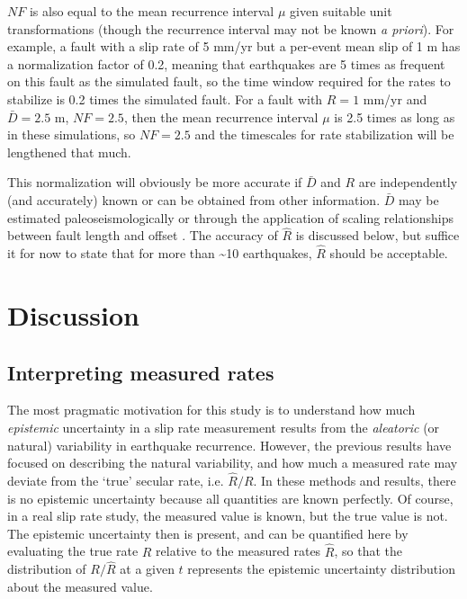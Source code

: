 \documentclass[se, manuscript]{copernicus}
\begin{document}
\(NF\) is also equal to the mean recurrence interval \(\mu\) given
suitable unit transformations (though the recurrence interval may not be
known \emph{a priori}). For example, a fault with a slip rate of 5 mm/yr
but a per-event mean slip of 1 m has a normalization factor of 0.2,
meaning that earthquakes are 5 times as frequent on this fault as the
simulated fault, so the time window required for the rates to stabilize
is 0.2 times the simulated fault. For a fault with \(R=1\) mm/yr and
\(\bar{D}=2.5\) m, \(NF=2.5\), then the mean recurrence interval \(\mu\)
is 2.5 times as long as in these simulations, so \(NF=2.5\) and the
timescales for rate stabilization will be lengthened that much.

This normalization will obviously be more accurate if \(\bar{D}\) and \(R\) are
independently (and accurately) known or can be obtained from other information.
\(\bar{D}\) may be estimated paleoseismologically or through the application of
scaling relationships between fault length and offset
\citep{wells_new_1994,leonard_earthquake_2010}. The accuracy of \(\hat{R}\) is
discussed below, but suffice it for now to state that for more than
\textasciitilde{}10 earthquakes, \(\hat{R}\) should be acceptable.

\section{Discussion}\label{discussion}

\subsection{Interpreting measured
rates}\label{interpreting-measured-rates}

The most pragmatic motivation for this study is to understand how much
\emph{epistemic} uncertainty in a slip rate measurement results from the
\emph{aleatoric} (or natural) variability in earthquake
recurrence. However, the previous results have focused on describing the
natural variability, and how much a measured rate may deviate from the
`true' secular rate, i.e. \(\hat{R}/R\). In these methods and results,
there is no epistemic uncertainty because all quantities are known
perfectly. Of course, in a real slip rate study, the measured value is
known, but the true value is not. The epistemic uncertainty then is
present, and can be quantified here by evaluating the true rate \(R\)
relative to the measured rates \(\hat{R}\), so that the distribution of
\(R / \hat{R}\) at a given \(t\) represents the epistemic uncertainty
distribution about the measured value.
\end{document}
